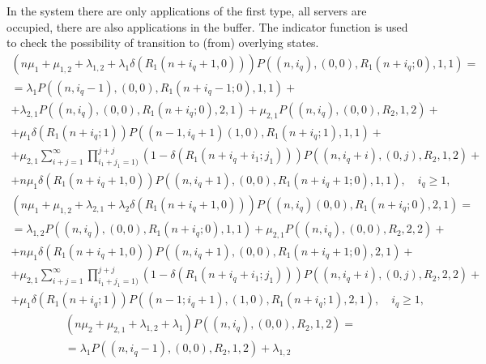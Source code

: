 \documentclass[default]{subfiles}
\begin{document}
{In the system there are only applications of the first type, all
servers are occupied, there are also applications in the buffer. The
indicator function is used to check the possibility of transition to
(from) overlying states.
\begin{multline}
  \left(n\mu_1+\mu_{1,2}+\lambda_{1,2}+\lambda_1 \delta\left(R_1
      (n+i_q+1,0)\right)\right) P\left((n,i_q),(0,0),R_1
    (n+i_q;0),1,1\right) = \\ = \lambda_1 P\left((n,i_q-1),(0,0),R_1
    (n+i_q-1;0),1,1\right)+ \\ +\lambda_{2,1} P\left((n,i_q),(0,0),R_1
    (n+i_q;0),2,1\right)+ %
  \mu_{2,1}
  P\left((n,i_q),(0,0),R_2,1,2\right)+ \\ +\mu_1 \delta\left(R_1
    (n+i_q;1)\right) P\left((n-1,i_q+1)(1,0),R_1 (n+i_q;1),1,1\right)+
  \\ + \mu_{2,1}
  \sum\limits_{i+j=1}^{\infty}\prod\limits_{i_1+j_1=1)}^{j+j}\left(1-\delta\left(R_1
      (n+i_q+i_1;j_1) \right)\right)
  P\left((n,i_q+i),(0,j),R_2,1,2\right)+\\ + n\mu_1 \delta\left(R_1
    (n+i_q+1,0)\right) P\left((n,i_q+1),(0,0),R_1
    (n+i_q+1;0),1,1\right), \quad i_q\geqslant 1,
\label{eq:4.1}
\end{multline}
\begin{multline}
  \left(n\mu_1+\mu_{1,2}+\lambda_{2,1}+\lambda_2\delta\left(R_1
      (n+i_q+1,0)\right)\right) P\left((n,i_q)(0,0),R_1
    (n+i_q;0),2,1\right) = \\ =
  \lambda_{1,2} P\left((n,i_q),(0,0),R_1 (n+i_q;0),1,1\right)+
  \mu_{2,1} P\left((n,i_q),(0,0),R_2,2,2\right)+\\ + n\mu_1
  \delta\left(R_1 (n+i_q+1,0)\right) P\left((n,i_q+1),(0,0),R_1
    (n+i_q+1;0),2,1\right) +\\ + \mu_{2,1}
  \sum\limits_{i+j=1}^{\infty}\prod\limits_{i_1+j_1=1)}^{j+j}\left(1-\delta\left(R_1
      (n+i_q+i_1;j_1) \right)\right)
  P\left((n,i_q+i),(0,j),R_2,2,2\right)+\\ + \mu_1 \delta\left(R_1
    (n+i_q;1)\right) P\left((n-1;i_q+1),(1,0),R_1
    (n+i_q;1),2,1\right), \quad i_q\geqslant 1,
\label{eq:4.2}
\end{multline}
\begin{multline}
  \left(n\mu_2+\mu_{2,1}+\lambda_{1,2}+\lambda_1\right)
  P\left((n,i_q),(0,0),R_2,1,2\right) = \\ =\lambda_1
  P\left((n,i_q-1),(0,0),R_2,1,2\right)+ \lambda_{1,2}

\end{multline}}
\end{document}
